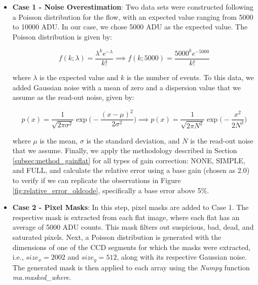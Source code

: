 \begin{itemize}
    \item \textbf{Case 1 - Noise Overestimation}: Two data sets were constructed following a Poisson distribution for the flow, with an expected value ranging from 5000 to 10000 ADU. In our case, we chose 5000 ADU as the expected value. The Poisson distribution is given by:
 
    \begin{equation}
        f(k;\lambda) = \frac{\lambda^k e^{-\lambda}}{k!} \implies f(k;5000) = \frac{5000^k e^{-5000}}{k!}
    \end{equation}
    \label{eq:dist_Poisson}

    where $\lambda$ is the expected value and $k$ is the number of events. To this data, we added Gaussian noise with a mean of zero and a dispersion value that we assume as the read-out noise, given by:
    
    \begin{equation}
        p(x) = \frac{1}{\sqrt{2 \pi \sigma^2}} \exp \Big(-\frac{(x - \mu)^2}{2\sigma^2} \Big) \implies p(x) = \frac{1}{\sqrt{2 \pi N^2}} \exp \Big(-\frac{x^2}{2N^2} \Big)
        \label{eq:gaussian_noise}
    \end{equation}
    
    where $\mu$ is the mean, $\sigma$ is the standard deviation, and $N$ is the read-out noise that we assume. Finally, we apply the methodology described in Section \ref{subsec:method_gainflat} for all types of gain correction: NONE, SIMPLE, and FULL, and calculate the relative error using a base gain (chosen as 2.0) to verify if we can replicate the observations in Figure \ref{fig:relative_error_oldcode}, specifically a base error above 5\%.

    \item \textbf{Case 2 - Pixel Masks}: In this step, pixel masks are added to Case 1. The respective mask is extracted from each flat image, where each flat has an average of 5000 ADU counts. This mask filters out suspicious, bad, dead, and saturated pixels. Next, a Poisson distribution is generated with the dimensions of one of the CCD segments for which the masks were extracted, i.e., $size_x = 2002$ and $size_y = 512$, along with its respective Gaussian noise. The generated mask is then applied to each array using the \textit{Numpy} function \citep{2020Natur.585..357H} \textit{ma.masked\_where}.


\end{itemize}
